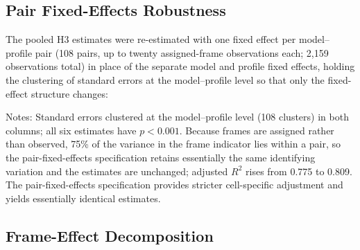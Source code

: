 \documentclass[11pt]{article}
\begin{document}
\begin{table}[htbp]
\begin{flushleft}
\end{flushleft}
\end{table}

\subsection*{Pair Fixed-Effects Robustness}
\label{app:h3-pairfe}

The pooled H3 estimates were re-estimated with one fixed effect per model--profile pair (108 pairs, up to twenty assigned-frame observations each; 2,159 observations total) in place of the separate model and profile fixed effects, holding the clustering of standard errors at the model--profile level so that only the fixed-effect structure changes:

\begin{table}[htbp]
\centering
\caption{Pooled H3 estimates under two-way and pair fixed effects}
\label{tab:h3_pairfe}
\begin{flushleft}
\footnotesize Notes: Standard errors clustered at the model--profile level (108 clusters) in both columns; all six estimates have \(p<0.001\). Because frames are assigned rather than observed, 75\% of the variance in the frame indicator lies within a pair, so the pair-fixed-effects specification retains essentially the same identifying variation and the estimates are unchanged; adjusted \(R^2\) rises from 0.775 to 0.809. The pair-fixed-effects specification provides stricter cell-specific adjustment and yields essentially identical estimates.
\end{flushleft}
\end{table}

\subsection{Frame-Effect Decomposition}
\label{app:h3-decomposition}
\end{document}
